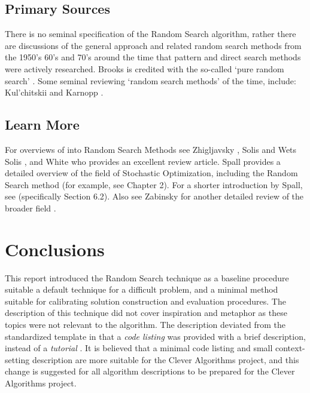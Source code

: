 \documentclass[a4paper, 11pt]{article}
\begin{document}
% 
% 
\subsection{Primary Sources}
There is no seminal specification of the Random Search algorithm, rather there are discussions of the general approach and related random search methods from the 1950's 60's and 70's around the time that pattern and direct search methods were actively researched.
Brooks is credited with the so-called `pure random search' \cite{Brooks1958}. Some seminal reviewing `random search methods' of the time, include: Kul'chitskii \cite{Kul'chitskii1976} and Karnopp \cite{Karnopp1963}.


% 
% 
\subsection{Learn More}
For overviews of into Random Search Methods see Zhigljavsky \cite{Zhigljavsky1991}, Solis and Wets Solis \cite{Solis1981}, and White \cite{White1971} who provides an excellent review article.
Spall provides a detailed overview of the field of Stochastic Optimization, including the Random Search method \cite{Spall2003} (for example, see Chapter 2). For a shorter introduction by Spall, see \cite{Spall2004} (specifically Section 6.2). Also see Zabinsky for another detailed review of the broader field \cite{Zabinsky2003}.


% 
% 
\section{Conclusions}
\label{sec:conclusions}
This report introduced the Random Search technique as a baseline procedure suitable a default technique for a difficult problem, and a minimal method suitable for calibrating solution construction and evaluation procedures.
The description of this technique did not cover inspiration and metaphor as these topics were not relevant to the algorithm. The description deviated from the standardized template in that a \emph{code listing} was provided with a brief description, instead of a \emph{tutorial} \cite{Brownlee2010a}. It is believed that a minimal code listing and small context-setting description are more suitable for the Clever Algorithms project, and this change is suggested for all algorithm descriptions to be prepared for the Clever Algorithms project. 
\end{document}
